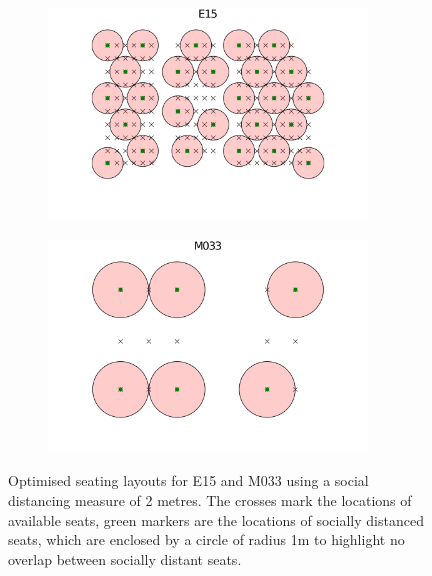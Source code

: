 \documentclass[12pt]{article}
\numberwithin{equation}{section}
\begin{document}
\begin{figure}[H]
         \centering
 \begin{subfigure}[b]{1\textwidth}
         \centering
         \includegraphics[width=0.93\textwidth]{E15_26_circles.png}
         \label{fig:E15}
     \end{subfigure}        
     \hfill
     \vspace{-2cm}
     \begin{subfigure}[b]{1\textwidth}
         \centering
         \includegraphics[width=0.93\textwidth]{M033_6_circles.png}
         \label{fig:M033}
     \end{subfigure}
         \hfill
         \caption{Optimised seating layouts for E15 and M033 using a social distancing measure of 2 metres. The crosses mark the locations of available seats, green markers are the locations of socially distanced seats, which are enclosed by a circle of radius 1m to highlight no overlap between socially distant seats.}
        \label{fig:E15 and M033}
\end{figure}
\end{document}
